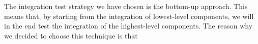 The integration test strategy we have chosen is the bottom-up approach. This means that, by starting from the integration of lowest-level components, we will in the end test the integration of the highest-level components.
The reason why we decided to choose this technique is that 